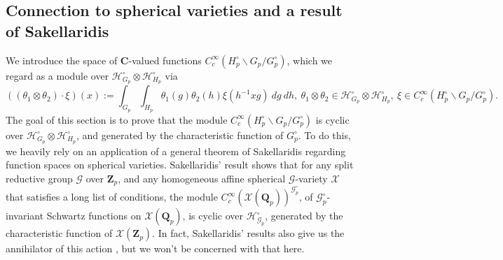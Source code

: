 \documentclass{amsart}%
\theoremstyle{plain}
\theoremstyle{plain}
\theoremstyle{remark}
\begin{document}
\subsection{Connection to spherical varieties and a result of Sakellaridis} 
We introduce the space of $\mathbf{C}$-valued functions $C_c^\infty(H_p^\circ\backslash G_p/ G_p^\circ)$, which we regard as a module over $\mathcal{H}_{G_p}^\circ\otimes \mathcal{H}_{H_p}^\circ$ via
$$\left((\theta_1\otimes \theta_2)\cdot\xi\right)(x):=\int_{G_p}\int_{H_p} \theta_1(g)\theta_2(h)\xi(h^{-1}xg)\ dg\ dh, \ \theta_1\otimes \theta_2\in \mathcal{H}_{G_p}^\circ\otimes \mathcal{H}_{H_p}^\circ,\ \xi\in C_c^\infty(H_p^\circ\backslash G_p/ G_p^\circ).$$
The goal of this section is to prove that the module $C_c^\infty(H_p^\circ\backslash G_p/G_p^\circ)$ is cyclic over $\mathcal{H}_{G_p}^\circ \otimes \mathcal{H}_{H_p}^\circ$, and generated by the characteristic function of $G_p^\circ$. To do this, we heavily rely on an application of a general theorem of Sakellaridis \cite{sakellaridis2013spherical} regarding function spaces on spherical varieties. Sakellaridis' result \cite[Corollary $8.0.4$]{sakellaridis2013spherical}  shows that for any split reductive group $\mathscr{G}$ over $\mathbf{Z}_p$, and any homogeneous affine spherical $\mathscr{G}$-variety $\mathcal{X}$ that satisfies a long list of conditions, the module $C_c^\infty(\mathcal{X}(\mathbf{Q}_p))^{\mathscr{G}_p^\circ}$, of $\mathscr{G}_p^\circ$-invariant Schwartz functions on $\mathcal{X}(\mathbf{Q}_p)$, is cyclic over $\mathcal{H}_{\mathscr{G}_p}^\circ$, generated by the characteristic function of $\mathcal{X}(\mathbf{Z}_p)$. In fact, Sakellaridis' results also give us the annihilator of this action \cite[Theorem $8.0.2$]{sakellaridis2013spherical}, but we won't be concerned with that here.
\end{document}
